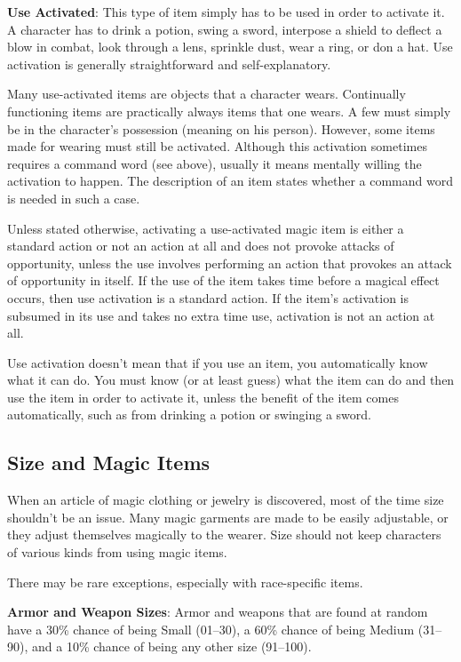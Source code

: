 \textbf{Use Activated}: This type of item simply has to be used in order to activate it. A character has to drink a potion, swing a sword, interpose a shield to deflect a blow in combat, look through a lens, sprinkle dust, wear a ring, or don a hat. Use activation is generally straightforward and self-explanatory.
				
Many use-activated items are objects that a character wears. Continually functioning items are practically always items that one wears. A few must simply be in the character's possession (meaning on his person). However, some items made for wearing must still be activated. Although this activation sometimes requires a command word (see above), usually it means mentally willing the activation to happen. The description of an item states whether a command word is needed in such a case.
				
Unless stated otherwise, activating a use-activated magic item is either a standard action or not an action at all and does not provoke attacks of opportunity, unless the use involves performing an action that provokes an attack of opportunity in itself. If the use of the item takes time before a magical effect occurs, then use activation is a standard action. If the item's activation is subsumed in its use and takes no extra time use, activation is not an action at all.
				
Use activation doesn't mean that if you use an item, you automatically know what it can do. You must know (or at least guess) what the item can do and then use the item in order to activate it, unless the benefit of the item comes automatically, such as from drinking a potion or swinging a sword.
				
\subsection{Size and Magic Items}

				
When an article of magic clothing or jewelry is discovered, most of the time size shouldn't be an issue. Many magic garments are made to be easily adjustable, or they adjust themselves magically to the wearer. Size should not keep characters of various kinds from using magic items.
				
There may be rare exceptions, especially with race-specific items. 
				
\textbf{Armor and Weapon Sizes}: Armor and weapons that are found at random have a 30\% chance of being Small (01--30), a 60\% chance of being Medium (31--90), and a 10\% chance of being any other size (91--100).
				
